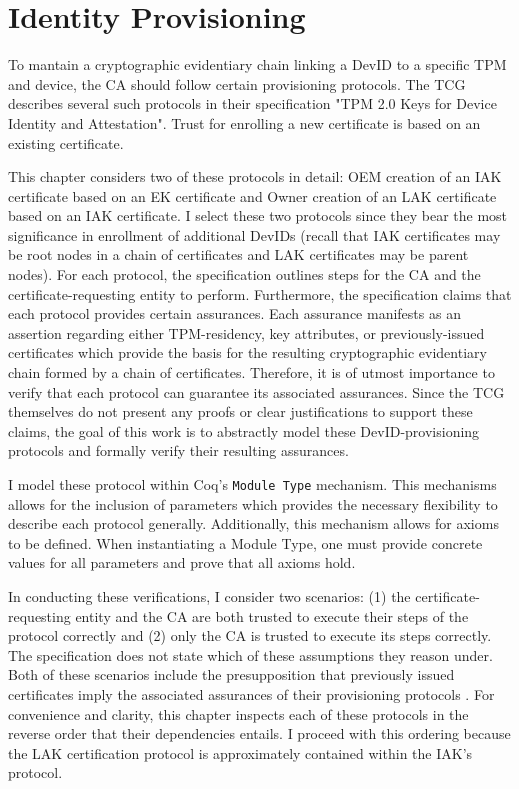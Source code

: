 \chapter{Identity Provisioning}


To mantain a cryptographic evidentiary chain linking a DevID to a specific TPM and device, the CA should follow certain provisioning protocols. The TCG describes several such protocols in their specification "TPM 2.0 Keys for Device Identity and Attestation". Trust for enrolling a new certificate is based on an existing certificate. 

This chapter considers two of these protocols in detail: OEM creation of an IAK certificate based on an EK certificate and Owner creation of an LAK certificate based on an IAK certificate. I select these two protocols since they bear the most significance in enrollment of additional DevIDs (recall that IAK certificates may be root nodes in a chain of certificates and LAK certificates may be parent nodes). For each protocol, the specification outlines steps for the CA and the certificate-requesting entity to perform.
Furthermore, the specification claims that each protocol provides certain assurances. Each assurance manifests as an assertion regarding either TPM-residency, key attributes, or previously-issued certificates which provide the basis for the resulting cryptographic evidentiary chain formed by a chain of certificates. Therefore, it is of utmost importance to verify that each protocol can guarantee its associated assurances.
Since the TCG themselves do not present any proofs or clear justifications to support these claims, the goal of this work is to abstractly model these DevID-provisioning protocols and formally verify their resulting assurances.


I model these protocol within Coq's \verb|Module Type| mechanism. This mechanisms allows for the inclusion of parameters which provides the necessary flexibility to describe each protocol generally. Additionally, this mechanism allows for axioms to be defined. When instantiating a Module Type, one must provide concrete values for all parameters and prove that all axioms hold.

In conducting these verifications, I consider two scenarios: (1) the certificate-requesting entity and the CA are both trusted to execute their steps of the protocol correctly and (2) only the CA is trusted to execute its steps correctly. The specification does not state which of these assumptions they reason under. 
Both of these scenarios include the presupposition that previously issued certificates imply the associated assurances of their provisioning protocols .
For convenience and clarity, this chapter inspects each of these protocols in the reverse order that their dependencies entails. I proceed with this ordering because the LAK certification protocol is approximately contained within the IAK's protocol. 




